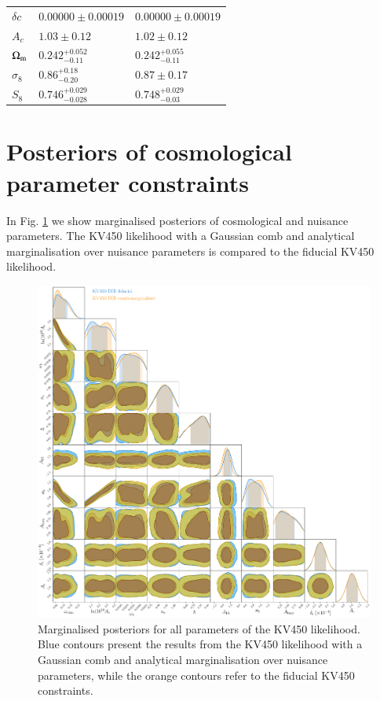 \documentclass{aa}
\begin{document}
\begin{appendix}
\begin{table}
\begin{tabular}{lll}
$\delta c             $ & $0.00000\pm 0.00019        $& $0.00000\pm 0.00019        $\\

$A_c             $ & $1.03\pm 0.12              $& $1.02\pm 0.12              $\\

$\Omega_{\rm m}    $ & $0.242^{+0.052}_{-0.11}    $& $0.242^{+0.055}_{-0.11}    $\\

$\sigma_8        $ & $0.86^{+0.18}_{-0.20}      $& $0.87\pm 0.17      $\\
$S_8$           & $0.746_{-0.028}^{+0.029}$&$0.748_{-0.03}^{+0.029}$\\
\hline
\end{tabular}
\label{tab:consistency}
\end{table}

\section{Posteriors of cosmological parameter constraints}
\label{ap:posteriors}
In Fig. \ref{fig:posteriors} we show marginalised posteriors of cosmological and nuisance parameters. The KV450 likelihood with a Gaussian comb and analytical marginalisation over nuisance parameters is compared to the fiducial KV450 likelihood.
\begin{figure}
\centering
\includegraphics[width=\linewidth]{posteriors.pdf}
\caption{Marginalised posteriors for all parameters of the KV450 likelihood. Blue contours present the results from the KV450 likelihood with a Gaussian comb and analytical marginalisation over nuisance parameters, while the orange contours refer to the fiducial KV450 constraints.}
\label{fig:posteriors}
\end{figure}
\end{appendix}
%
\end{document}
